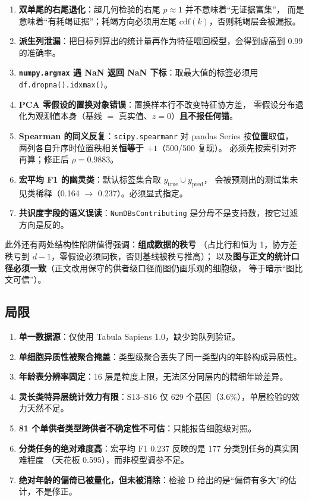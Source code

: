 \documentclass[UTF8, a4paper, 11pt]{ctexart}
\newcommand{\code}[1]{\texttt{\small #1}}
\begin{document}
\begin{enumerate}[label=(\arabic*)]
  \item \textbf{双单尾的右尾退化}：超几何检验的右尾 $p \approx 1$ 并不意味着“无证据富集”，
        而是意味着“有耗竭证据”；耗竭方向必须用左尾 $\mathrm{cdf}(k)$，否则耗竭层会被漏报。
  \item \textbf{派生列泄漏}：把目标列算出的统计量再作为特征喂回模型，会得到虚高到 0.99 的准确率。
  \item \textbf{\texttt{numpy.argmax} 遇 NaN 返回 NaN 下标}：取最大值的标签必须用
        \code{df.dropna().idxmax()}。
  \item \textbf{PCA 零假设的置换对象错误}：置换样本行不改变特征协方差，
        零假设分布退化为观测值本身（基线 $=$ 真实值、$z = 0$）\textbf{且不报任何错}。
  \item \textbf{Spearman 的同义反复}：\texttt{scipy.spearmanr} 对 pandas Series 按\textbf{位置}取值，
        两列各自升序时位置秩相关\textbf{恒等于 $+1$}（500/500 复现）。
        必须先按索引对齐再算；修正后 $\rho = 0.9883$。
  \item \textbf{宏平均 F1 的幽灵类}：默认标签集合取 $y_{\text{true}} \cup y_{\text{pred}}$，
        会被预测出的测试集未见类稀释（0.164 $\to$ 0.237）。必须显式指定。
  \item \textbf{共识度字段的语义误读}：\texttt{NumDBsContributing} 是分母不是支持数，按它过滤方向是反的。
\end{enumerate}

此外还有两处结构性陷阱值得强调：\textbf{组成数据的秩亏}
（占比行和恒为 1，协方差秩亏到 $d-1$，零假设必须同秩，否则基线被秩亏推高）；
以及\textbf{图与正文的统计口径必须一致}（正文改用保守的供者级口径而图仍画乐观的细胞级，
等于暗示“图比文可信”）。

\subsection{局限}

\begin{enumerate}[label=(\arabic*)]
  \item \textbf{单一数据源}：仅使用 Tabula Sapiens 1.0，缺少跨队列验证。
  \item \textbf{单细胞异质性被聚合掩盖}：类型级聚合丢失了同一类型内的年龄构成异质性。
  \item \textbf{年龄表分辨率固定}：16 层是粒度上限，无法区分同层内的精细年龄差异。
  \item \textbf{灵长类特异层统计效力有限}：S13--S16 仅 629 个基因（3.6\%），单层检验的效力天然不足。
  \item \textbf{81 个单供者类型跨供者不确定性不可估}：只能报告细胞级对照。
  \item \textbf{分类任务的绝对难度高}：宏平均 F1 0.237 反映的是 177 分类别任务的真实困难程度
        （天花板 0.595），而非模型调参不足。
  \item \textbf{绝对年龄的偏倚已被量化，但未被消除}：检验 D 给出的是“偏倚有多大”的估计，不是修正。
\end{enumerate}
\end{document}
